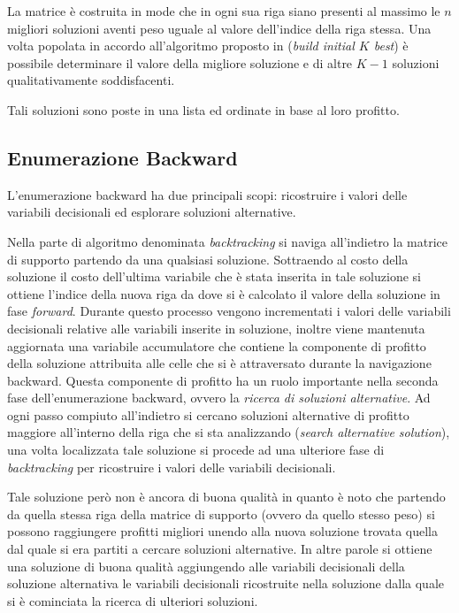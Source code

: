 \documentclass{llncs}
\newcommand{\labelssec}[1]{\label{ssec:#1}}
\begin{document}
La matrice è costruita in mode che in ogni sua riga siano presenti al massimo le $n$ migliori soluzioni aventi peso uguale al valore dell'indice della riga stessa. Una volta popolata in accordo all'algoritmo proposto in \cite{YANASSE2000} (\emph{build initial $K$ best}) è possibile determinare il valore della migliore soluzione e di altre $K-1$ soluzioni qualitativamente soddisfacenti.

Tali soluzioni sono poste in una lista ed ordinate in base al loro profitto.

\subsection{Enumerazione Backward} 
\labelssec{backward}

L'enumerazione backward ha due principali scopi: ricostruire i valori delle variabili decisionali ed esplorare soluzioni alternative.

Nella parte di algoritmo denominata \emph{backtracking} si naviga all'indietro la matrice di supporto partendo da una qualsiasi soluzione. Sottraendo al costo della soluzione il costo dell'ultima variabile che è stata inserita in tale soluzione si ottiene l'indice della nuova riga da dove si è calcolato il valore della soluzione in fase \emph{forward}. Durante questo processo vengono incrementati i valori delle variabili decisionali relative alle variabili inserite in soluzione, inoltre viene mantenuta aggiornata una variabile accumulatore che contiene la componente di profitto della soluzione attribuita alle celle che si è attraversato durante la navigazione backward.
Questa componente di profitto ha un ruolo importante nella seconda fase dell'enumerazione backward, ovvero la \emph{ricerca di soluzioni alternative}.
Ad ogni passo compiuto all'indietro si cercano soluzioni alternative di profitto maggiore all'interno della riga che si sta analizzando (\emph{search alternative solution}), una volta localizzata tale soluzione si procede ad una ulteriore fase di \emph{backtracking} per ricostruire i valori delle variabili decisionali. 

Tale soluzione però non è ancora di buona qualità in quanto è noto che partendo da quella stessa riga della matrice di supporto (ovvero da quello stesso peso) si possono raggiungere profitti migliori unendo alla nuova soluzione trovata quella dal quale si era partiti a cercare soluzioni alternative. 
In altre parole si ottiene una soluzione di buona qualità aggiungendo alle variabili decisionali della soluzione alternativa le variabili decisionali ricostruite nella soluzione dalla quale si è cominciata la ricerca di ulteriori soluzioni.  
\end{document}
